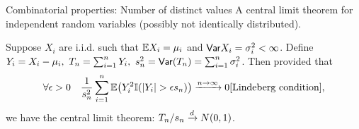\begin{frame}[allowframebreaks]{Combinatorial properties: Number of distinct values}
A central limit theorem for independent random variables (possibly not identically distributed).

\begin{theorem}
Suppose $X_i$ are i.i.d. such that $\mathbb{E} X_i = \mu_i$ and $\mathsf{Var} X_i = \sigma_i^2 <\infty$. Define $Y_i = X_i - \mu_i,\ T_n = \sum_{i=1}^n Y_i,\ s_n^2 = \mathsf{Var} (T_n) = \sum_{i=1}^n\sigma_i^2$. Then provided that
\begin{equation*}
    \forall \epsilon > 0\quad \frac{1}{s_n^2}\sum_{i=1}^n\E \big(Y_i^2 \mathbb{I}(|Y_i|>\epsilon s_n) \big)\xrightarrow{n\rightarrow \infty} 0 \text{[Lindeberg condition],}
\end{equation*}
we have the central limit theorem: $T_n/s_n \xrightarrow{\small{d}}N(0,1)$.
\end{theorem}

\end{frame}



